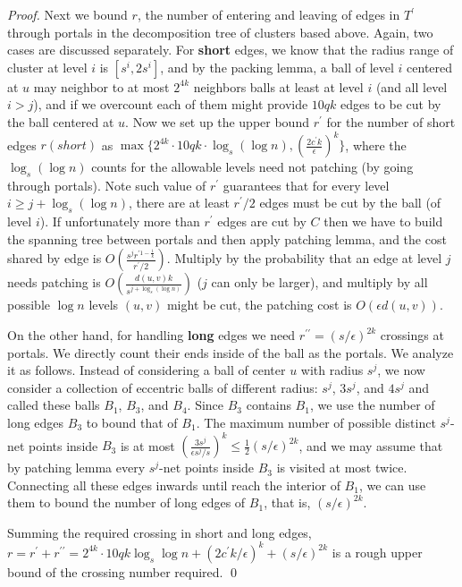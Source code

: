 \documentclass{llncs}
\begin{document}
\begin{proof}
Next we bound $r$, the number of entering and leaving of edges in $T^\prime$ through portals in the decomposition tree of clusters based above. Again, two cases are discussed separately.
For \textbf{short} edges, we know that the radius range of cluster at level $i$ is $[s^i, 2s^i]$, and by the packing lemma, a ball of level $i$ centered at $u$ may neighbor to at most $2^{4k}$ neighbors balls at least at level $i$ (and all level $i > j$), and if we overcount each of them might provide $10qk$ edges to be cut by the ball centered at $u$.
Now we set up the upper bound $r^\prime$ for the number of short edges $r(short)$ as $\max\{2^{4k}\cdot 10qk\cdot\log_s{(\log n)}, (\frac{2c^\prime k}{\epsilon})^{k}\}$, where the $\log_s(\log n)$ counts for the allowable levels need not patching (by going through portals).
Note such value of $r^\prime$ guarantees that for every level $i\geq j+\log_s(\log n)$, there are at least $r^\prime/2$ edges must be cut by the ball (of level $i$).
If unfortunately more than $r^\prime$ edges are cut by $C$ then we have to build the spanning tree between portals and then apply patching lemma, and the cost shared by edge is $O(\frac{s^j r^{\prime 1-\frac{1}{k}}}{r^\prime/2})$.
Multiply by the probability that an edge at level $j$ needs patching is $O(\frac{d(u,v)k}{s^{j+\log_s(\log n)}})$ ($j$ can only be larger), and multiply by all possible $\log n$ levels $(u,v)$ might be cut, the patching cost is $O(\epsilon d(u,v))$.

On the other hand, for handling \textbf{long} edges we need $r^{\prime\prime}=(s/\epsilon)^{2k}$ crossings at portals.
We directly count their ends inside of the ball as the portals.
We analyze it as follows.
Instead of considering a ball of center $u$ with radius $s^j$, we now consider a collection of eccentric balls of different radius: $s^j$, $3s^j$, and $4s^j$ and called these balls $B_1$, $B_3$, and $B_4$.
Since $B_3$ contains $B_1$, we use the number of long edges $B_3$ to bound that of $B_1$.
The maximum number of possible distinct $s^j$-net points inside $B_3$ is at most $(\frac{3s^j}{\epsilon s^j/s})^k\leq \frac{1}{2}(s/\epsilon)^{2k}$, and we may assume that by patching lemma every $s^j$-net points inside $B_3$ is visited at most twice.
Connecting all these edges inwards until reach the interior of $B_1$, we can use them to bound the number of long edges of $B_1$, that is, $(s/\epsilon)^{2k}$.

Summing the required crossing in short and long edges, $r=r^\prime+r^{\prime\prime}=2^{4k}\cdot10qk\log_s{\log n}+(2c^\prime k/\epsilon)^k+(s/\epsilon)^{2k}$ is a rough upper bound of the crossing number required.
\qed
\end{proof}
\end{document}
